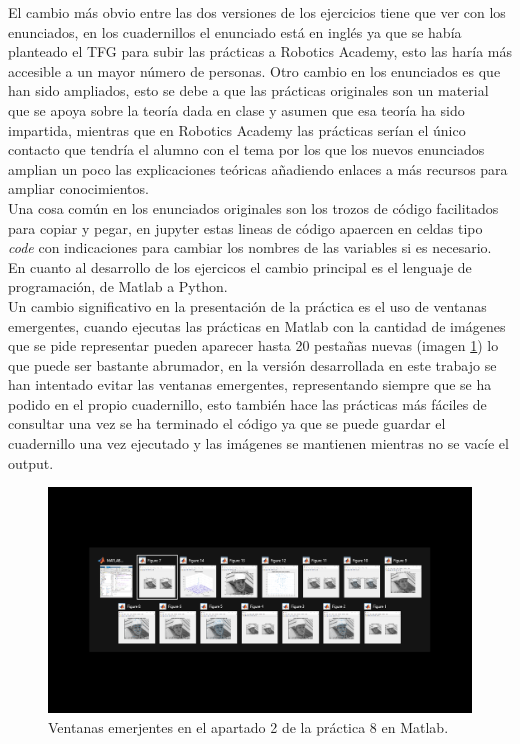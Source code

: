 \documentclass[a4paper,12pt]{report}
\begin{document}
El cambio más obvio entre las dos versiones de los ejercicios tiene que ver con los enunciados, en los cuadernillos el enunciado está en inglés ya que se había planteado el TFG para subir las prácticas a Robotics Academy, esto las haría más accesible a un mayor número de personas. Otro cambio en los enunciados es que han sido ampliados, esto se debe a que las prácticas originales son un material que se apoya sobre la teoría dada en clase y asumen que esa teoría ha sido impartida, mientras que en Robotics Academy las prácticas serían el único contacto que tendría el alumno con el tema por los que los nuevos enunciados amplian un poco las explicaciones teóricas añadiendo enlaces a más recursos para ampliar conocimientos.\\

Una cosa común en los enunciados originales son los trozos de código facilitados para copiar y pegar, en jupyter estas lineas de código apaercen en celdas tipo \emph{code} con indicaciones para cambiar los nombres de las variables si es necesario.\\

En cuanto al desarrollo de los ejercicos el cambio principal es el lenguaje de programación, de Matlab a Python. \\

Un cambio significativo en la presentación de la práctica es el uso de ventanas emergentes, cuando ejecutas las prácticas en Matlab con la cantidad de imágenes que se pide representar pueden aparecer hasta 20 pestañas nuevas  (imagen \ref{ventanas}) lo que puede ser bastante abrumador, en la versión desarrollada en este trabajo se han intentado evitar las ventanas emergentes, representando siempre que se ha podido en el propio cuadernillo, esto también hace las prácticas más fáciles de consultar una vez se ha terminado el código ya que se puede guardar el cuadernillo una vez ejecutado y las imágenes se mantienen mientras no se vacíe el output.\\

\begin{figure}[h]
\centering
\includegraphics[width=1\textwidth]{imagenes/ventanas}
\caption{Ventanas emerjentes en el apartado 2 de la práctica 8 en Matlab.}
\label{ventanas}
\end{figure}
\end{document}
